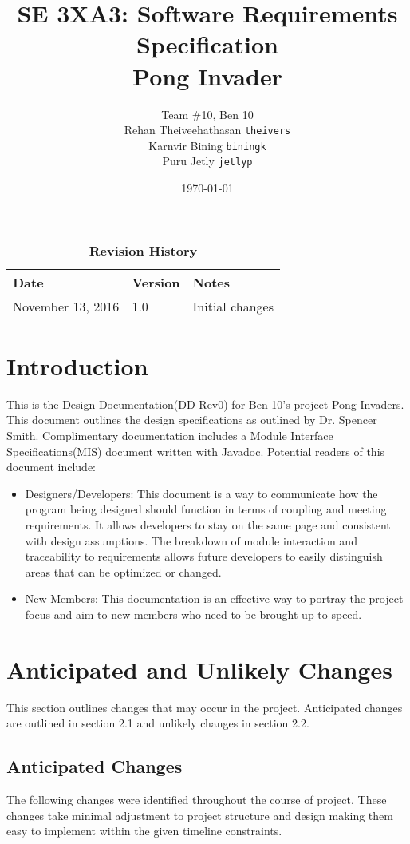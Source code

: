 \documentclass[12pt, titlepage]{article}
\title{SE 3XA3: Software Requirements Specification\\Pong Invader}
\author{Team \#10, Ben 10
		\\ Rehan Theiveehathasan \texttt{theivers}
		\\ Karnvir Bining                  \texttt{biningk}
		\\ Puru Jetly                        \texttt{jetlyp}
}
\date{\today}
\begin{document}
\maketitle
{}
\tableofcontents
\listoftables
\listoffigures
\begin{table}[bp]
\caption{\bf Revision History}
\begin{tabularx}{\textwidth}{p{3cm}p{2cm}X}
\toprule {\bf Date} & {\bf Version} & {\bf Notes}\\
\midrule
November 13, 2016 & 1.0 & Initial changes\\

\bottomrule
\end{tabularx}
\end{table}
\newpage
{}
\section{Introduction}
This is the Design Documentation(DD-Rev0) for Ben 10’s project Pong Invaders. This document outlines the design specifications as outlined by Dr. Spencer Smith.
Complimentary documentation includes a Module Interface Specifications(MIS) document written with Javadoc.  Potential readers of this document include:
\begin{itemize}
\item Designers/Developers: This document is a way to communicate how the program being designed should function in terms of coupling and meeting requirements. It allows developers to stay on the same page and consistent with design assumptions. The breakdown of module interaction and traceability to requirements allows future developers to easily distinguish areas that can be optimized or changed. 
\item New Members: This documentation is an effective way to portray the project focus and aim to new members who need to be brought up to speed. 
\end{itemize}

\section{Anticipated and Unlikely Changes} \label{SecChange}
This section outlines changes that may occur in the project. Anticipated changes are outlined in section 2.1 and unlikely changes in section 2.2.

\subsection{Anticipated Changes} \label{SecAchange}
 The following changes were identified throughout the course of project. These changes take minimal adjustment to project structure and design making them easy to implement within the given timeline constraints. 
\end{document}
